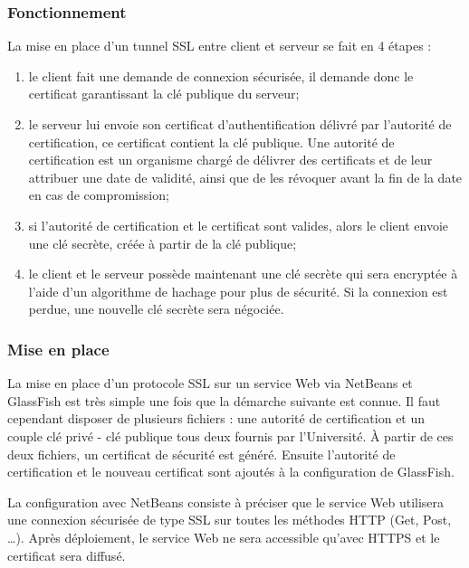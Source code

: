 \subsubsection{Fonctionnement}

\noindent La mise en place d'un tunnel SSL entre client et serveur se fait en 4 \'etapes :

\begin{enumerate}
	\item le client fait une demande de connexion s\'ecuris\'ee, il demande donc le certificat garantissant la cl\'e publique du serveur;
	\item le serveur lui envoie son certificat d'authentification d\'elivr\'e par l'autorit\'e de certification, ce certificat contient la cl\'e publique.
	Une autorit\'e de certification est un organisme charg\'e de d\'elivrer des certificats et de leur attribuer une date de validit\'e, ainsi que de les r\'evoquer avant la fin de la date en cas de compromission;
	\item si l'autorit\'e de certification et le certificat sont valides, alors le client envoie une cl\'e secr\`ete, cr\'e\'ee \`a partir de la cl\'e publique;
	\item le client et le serveur poss\`ede maintenant une cl\'e secr\`ete qui sera encrypt\'ee \`a l'aide d'un algorithme de hachage pour plus de s\'ecurit\'e.
	Si la connexion est perdue, une nouvelle cl\'e secr\`ete sera n\'egoci\'ee.

\end{enumerate}

\subsubsection{Mise en place}

La mise en place d'un protocole SSL sur un service Web via NetBeans et GlassFish est tr\`es simple une fois que la d\'emarche suivante est connue.
Il faut cependant disposer de plusieurs fichiers : une autorit\'e de certification et un couple cl\'e priv\'e - cl\'e publique tous deux fournis par l'Universit\'e.
\`A partir de ces deux fichiers, un certificat de s\'ecurit\'e est g\'en\'er\'e.
Ensuite l'autorit\'e de certification et le nouveau certificat sont ajout\'es \`a la configuration de GlassFish.

La configuration avec NetBeans consiste \`a pr\'eciser que le service Web utilisera une connexion s\'ecuris\'ee de type SSL sur toutes les m\'ethodes HTTP (Get, Post, \ldots).
Apr\`es d\'eploiement, le service Web ne sera accessible qu'avec HTTPS et le certificat sera diffus\'e.


